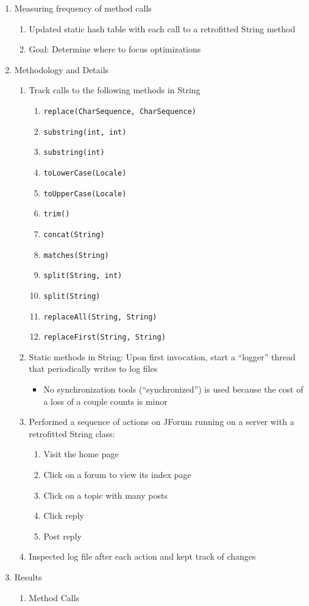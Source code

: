 \documentclass[times,11pt]{article}
\begin{document}
\begin{enumerate}
\begin{enumerate}
\begin{enumerate}
			\end{enumerate}
		\item Measuring frequency of method calls
			\begin{enumerate}
			\item Updated static hash table with each call to a retrofitted String method
			\item Goal: Determine where to focus optimizations
			\end{enumerate}
		\item Methodology and Details
			\begin{enumerate}
			\item Track calls to the following methods in String
				\begin{enumerate}
				\item \texttt{replace(CharSequence, CharSequence)}
				\item \texttt{substring(int, int)}
				\item \texttt{substring(int)}
				\item \texttt{toLowerCase(Locale)}
				\item \texttt{toUpperCase(Locale)}
				\item \texttt{trim()}
				\item \texttt{concat(String)}
				\item \texttt{matches(String)}
				\item \texttt{split(String, int)}
				\item \texttt{split(String)}
				\item \texttt{replaceAll(String, String)}
				\item \texttt{replaceFirst(String, String)}
				\end{enumerate}
			\item Static methods in String: Upon first invocation, start a ``logger'' thread that periodically writes to log files
				\begin{itemize}
				\item No synchronization tools (``synchronized'') is used because the cost of a loss of a couple counts is minor
				\end{itemize}
			\item Performed a sequence of actions on JForum running on a server with a retrofitted String class:
				\begin{enumerate}
				\item Visit the home page
				\item Click on a forum to view its index page
				\item Click on a topic with many posts
				\item Click reply
				\item Post reply
				\end{enumerate}
			\item Inspected log file after each action and kept track of changes
			\end{enumerate}
		\item Results
			\begin{enumerate}
			\item Method Calls
			

\end{enumerate}
\end{enumerate}
\end{enumerate}
\end{document}
